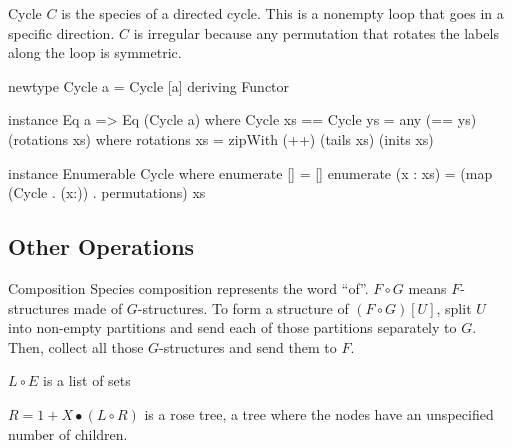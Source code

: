 \documentclass{beamer}
\begin{document}
\begin{frame}[fragile]{Cycle}
  \( C \) is the species of a directed cycle. This is a nonempty loop that goes in a specific
  direction. \( C \) is irregular because any permutation that rotates the labels along the loop is
  symmetric.

  \vfill
  \pause{}

  \begin{code}
newtype Cycle a = Cycle [a]
  deriving Functor

instance Eq a => Eq (Cycle a) where
  Cycle xs == Cycle ys = any (== ys) (rotations xs)
    where rotations xs = zipWith (++) (tails xs) (inits xs)

instance Enumerable Cycle where
  enumerate [] = []
  enumerate (x : xs) = (map (Cycle . (x:)) . permutations) xs
  \end{code}
\end{frame}

\subsection{Other Operations}
\begin{frame}{Composition}
  Species composition represents the word ``of''. \( F \circ G \) means \( F \)-structures made of
  \( G \)-structures. To form a structure of \( (F \circ G)[U] \), split \( U
  \) into non-empty partitions and send each of those partitions separately to \( G \).  Then,
  collect all those \( G \)-structures and send them to \(F \).

  \begin{exampleblock}{}
    \( L \circ E \) is a list of sets
  \end{exampleblock}

  \begin{exampleblock}{}
    \( R = 1 + X \bullet (L \circ R) \) is a rose
    tree, a tree where the nodes have an unspecified number of children.
  \end{exampleblock}
\end{frame}
\begin{frame}[fragile]
\end{frame}
\end{document}
